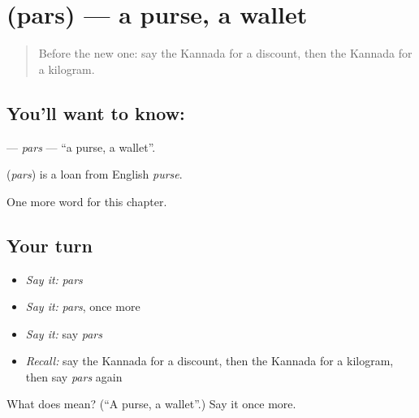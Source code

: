 \section[\texorpdfstring{\kn{ಪರ್ಸ್} (pars)}{ಪರ್ಸ್ (pars)}]{ (pars) — a purse, a wallet}

\label{lesson:KA-C185-pars}



\begin{quote}
Before the new one: say the Kannada for a discount, then the Kannada for a kilogram.
\end{quote}

\subsection*{You'll want to know: }
\textbf{} — \emph{pars} — \textquotedblleft{}a purse, a wallet\textquotedblright{}.

\begin{cousinweb}
\textbf{} (\emph{pars}) is a loan from English \emph{purse}.
\end{cousinweb}

\begin{grammarlens}[title={What you've built}]
One more word for this chapter.
\end{grammarlens}

\subsection*{Your turn}
\begin{itemize}
\raggedright
  \item \emph{Say it:} \emph{pars}
  \item \emph{Say it:} \emph{pars}, once more
  \item \emph{Say it:} say \emph{pars}
  \item \emph{Recall:} say the Kannada for a discount, then the Kannada for a kilogram, then say \emph{pars} again
\end{itemize}

\begin{tcolorbox}[breakable,colback=teal!4,colframe=teal!35!black,title={Before you move on}]
What does  mean? (\textquotedblleft{}A purse, a wallet\textquotedblright{}.) Say it once more.
\end{tcolorbox}
